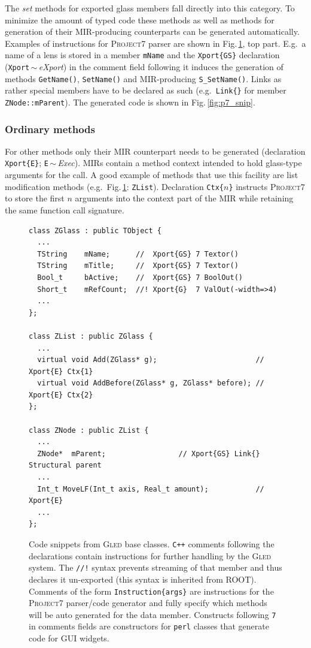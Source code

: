 \documentclass[a4paper,11pt]{article}
\def\gled{\textsc{Gled}\xspace}
\def\p7{\textsc{Project7}\xspace}
\def\smalltt#1{{\small\texttt{#1}}}
\def\foottt#1{{\footnotesize\texttt{#1}}}
\begin{document}
The \emph{set} methods for exported glass members fall directly into
this category. To minimize the amount of typed code these methods as
well as methods for generation of their MIR-producing counterparts can
be generated automatically. Examples of instructions for \p7 parser
are shown in Fig.\,\ref{fig:base_snip}, top part. E.g.\ a name of a lens
is stored in a member \smalltt{mName} and the \smalltt{Xport\{GS\}}
declaration (\smalltt{Xport}\,$\sim$\,\emph{eXport}) in the comment
field following it induces the generation of methods
\smalltt{GetName()}, \smalltt{SetName()} and MIR-producing
\smalltt{S\_SetName()}. Links as rather special members have to be
declared as such (e.g.\ \smalltt{Link\{\}} for member
\smalltt{ZNode::mParent}). The generated code is shown in
Fig.\,\ref{fig:p7_snip}.

\subsubsection{Ordinary methods}

For other methods only their MIR counterpart needs to be generated
(declaration \smalltt{Xport\{E\}}; \smalltt{E}\,$\sim$\,\emph{Exec}).
MIRs contain a method context intended to hold glass-type arguments
for the call. A good example of methods that use this facility are
list modification methods (e.g.\ Fig.\,\ref{fig:base_snip}:
\smalltt{ZList}).  Declaration \smalltt{Ctx\{{\footnotesize $n$}\}}
instructs \p7 to store the first $n$ arguments into the context part of the
MIR while retaining the same function call signature.

\begin{figure}
\centering
\scriptsize
\begin{verbatim}
class ZGlass : public TObject {
  ...
  TString    mName;      //  Xport{GS} 7 Textor()
  TString    mTitle;     //  Xport{GS} 7 Textor()
  Bool_t     bActive;    //  Xport{GS} 7 BoolOut()
  Short_t    mRefCount;  //! Xport{G}  7 ValOut(-width=>4)
  ...
};

class ZList : public ZGlass {
  ...
  virtual void Add(ZGlass* g);                       // Xport{E} Ctx{1}
  virtual void AddBefore(ZGlass* g, ZGlass* before); // Xport{E} Ctx{2}
};

class ZNode : public ZList {
  ...
  ZNode*  mParent;                 // Xport{GS} Link{} Structural parent
  ...
  Int_t MoveLF(Int_t axis, Real_t amount);           // Xport{E}
  ...
};
\end{verbatim}  
  \caption{Code snippets from \gled base classes. 
    \foottt{C++} comments following the declarations contain
    instructions for further handling by the \gled system. The
    \foottt{//!} syntax prevents streaming of that member and thus
    declares it un-exported (this syntax is inherited from ROOT).
    Comments of the form \foottt{Instruction\{args\}} are instructions
    for the \p7 parser/code generator and fully specify which methods
    will be auto generated for the data member. Constructs following
    \foottt{7} in comments fields are constructors for \foottt{perl}
    classes that generate code for GUI widgets.}
  \label{fig:base_snip}
\end{figure}
\end{document}
